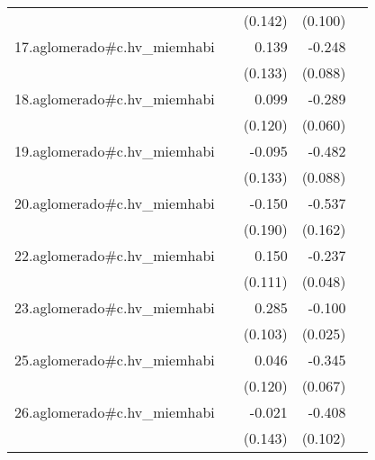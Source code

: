 {\begin{longtable}{l*{4}{D{.}{.}{-1}}}
            &                     &     (0.142)         &     (0.100)         &                     \\
\addlinespace
17.aglomerado#c.hv\_miemhabi&                     &       0.139         &      -0.248\sym{**} &                     \\
            &                     &     (0.133)         &     (0.088)         &                     \\
\addlinespace
18.aglomerado#c.hv\_miemhabi&                     &       0.099         &      -0.289\sym{***}&                     \\
            &                     &     (0.120)         &     (0.060)         &                     \\
\addlinespace
19.aglomerado#c.hv\_miemhabi&                     &      -0.095         &      -0.482\sym{***}&                     \\
            &                     &     (0.133)         &     (0.088)         &                     \\
\addlinespace
20.aglomerado#c.hv\_miemhabi&                     &      -0.150         &      -0.537\sym{***}&                     \\
            &                     &     (0.190)         &     (0.162)         &                     \\
\addlinespace
22.aglomerado#c.hv\_miemhabi&                     &       0.150         &      -0.237\sym{***}&                     \\
            &                     &     (0.111)         &     (0.048)         &                     \\
\addlinespace
23.aglomerado#c.hv\_miemhabi&                     &       0.285\sym{**} &      -0.100\sym{***}&                     \\
            &                     &     (0.103)         &     (0.025)         &                     \\
\addlinespace
25.aglomerado#c.hv\_miemhabi&                     &       0.046         &      -0.345\sym{***}&                     \\
            &                     &     (0.120)         &     (0.067)         &                     \\
\addlinespace
26.aglomerado#c.hv\_miemhabi&                     &      -0.021         &      -0.408\sym{***}&                     \\
            &                     &     (0.143)         &     (0.102)         &                     \\

\end{longtable}}
